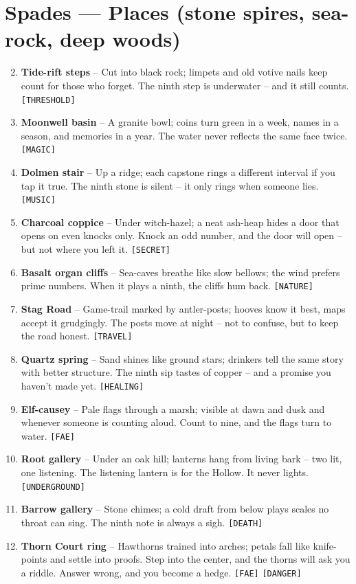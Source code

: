 \section*{Spades --- Places (stone spires, sea-rock, deep woods)}
\label{sec:aelinnel-places}
\begin{enumerate}
\setcounter{enumi}{1}
\item \textbf{Tide-rift steps} -- Cut into black rock; limpets and old votive nails keep count for those who forget. The ninth step is underwater -- and it still counts. \texttt{[THRESHOLD]}
\item \textbf{Moonwell basin} -- A granite bowl; coins turn green in a week, names in a season, and memories in a year. The water never reflects the same face twice. \texttt{[MAGIC]}
\item \textbf{Dolmen stair} -- Up a ridge; each capstone rings a different interval if you tap it true. The ninth stone is silent -- it only rings when someone lies. \texttt{[MUSIC]}
\item \textbf{Charcoal coppice} -- Under witch-hazel; a neat ash-heap hides a door that opens on even knocks only. Knock an odd number, and the door will open -- but not where you left it. \texttt{[SECRET]}
\item \textbf{Basalt organ cliffs} -- Sea-caves breathe like slow bellows; the wind prefers prime numbers. When it plays a ninth, the cliffs hum back. \texttt{[NATURE]}
\item \textbf{Stag Road} -- Game-trail marked by antler-posts; hooves know it best, maps accept it grudgingly. The posts move at night -- not to confuse, but to keep the road honest. \texttt{[TRAVEL]}
\item \textbf{Quartz spring} -- Sand shines like ground stars; drinkers tell the same story with better structure. The ninth sip tastes of copper -- and a promise you haven't made yet. \texttt{[HEALING]}
\item \textbf{Elf-causey} -- Pale flags through a marsh; visible at dawn and dusk and whenever someone is counting aloud. Count to nine, and the flags turn to water. \texttt{[FAE]}
\item \textbf{Root gallery} -- Under an oak hill; lanterns hang from living bark -- two lit, one listening. The listening lantern is for the Hollow. It never lights. \texttt{[UNDERGROUND]}
\item[J] \textbf{Barrow gallery} -- Stone chimes; a cold draft from below plays scales no throat can sing. The ninth note is always a sigh. \texttt{[DEATH]}
\item[Q] \textbf{Thorn Court ring} -- Hawthorns trained into arches; petals fall like knife-points and settle into proofs. Step into the center, and the thorns will ask you a riddle. Answer wrong, and you become a hedge. \texttt{[FAE]} \texttt{[DANGER]}

\end{enumerate}
